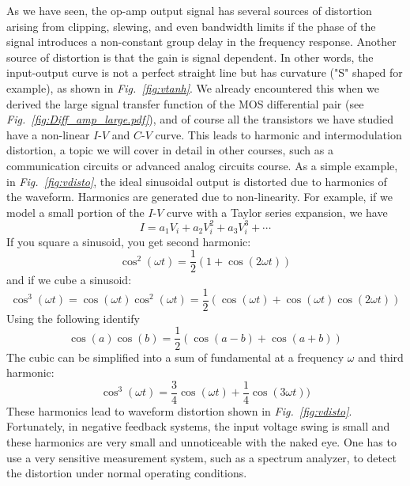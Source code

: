 As we have seen, the op-amp output signal has several sources of distortion arising from clipping, slewing, and even bandwidth limits if the phase of the signal introduces a non-constant group delay in the frequency response.  Another source of distortion is that the gain is signal dependent.  In other words, the input-output curve is not a perfect straight line but has curvature ("S" shaped for example), as shown in \emph{Fig.~\ref{fig:vtanh}}.  We already encountered this when we derived the large signal transfer function of the MOS differential pair (see \emph{Fig.~\ref{fig:Diff_amp_large.pdf}}), and of course all the transistors we have studied have a non-linear $I$-$V$ and $C$-$V$ curve.  This leads to harmonic and intermodulation distortion, a topic we will cover in detail in other courses, such as a communication circuits or advanced analog circuits course.  As a simple example, in \emph{Fig.~\ref{fig:vdisto}}, the ideal sinusoidal output is distorted due to harmonics of the waveform.  Harmonics are generated due to non-linearity.  For example, if we model a small portion of the $I$-$V$ curve with a Taylor series expansion, we have
    \begin{equation}
        I = a_1 V_i + a_2 V_i^2 + a_3 V_i^3 + \cdots
    \end{equation}
If you square a sinusoid, you get second harmonic:
    \begin{equation}
        \cos^2(\omega t) = \frac{1}{2} \left(1 + \cos(2 \omega t) \right)
    \end{equation}
and if we cube a sinusoid:
    \begin{equation}
        \cos^3(\omega t) = \cos(\omega t) \cos^2(\omega t) = \frac{1}{2} \left(\cos(\omega t) + \cos(\omega t)\cos(2 \omega t) \right)
    \end{equation}
Using the following identify
    \begin{equation}
        \cos(a) \cos(b) = \frac{1}{2} \left( \cos(a - b) + \cos(a + b) \right) 
    \end{equation}
The cubic can be simplified into a sum of fundamental at a frequency $\omega$ and third harmonic:
    \begin{equation}
        \cos^3(\omega t) =  \frac{3}{4} \cos(\omega t) + \frac{1}{4} \cos(3 \omega t)) 	
    \end{equation}
These harmonics lead to waveform distortion shown in \emph{Fig.~\ref{fig:vdisto}}.  Fortunately, in negative feedback systems, the input voltage swing is small and these harmonics are very small and unnoticeable with the naked eye.  One has to use a very sensitive measurement system, such as a spectrum analyzer, to detect the distortion under normal operating conditions.
